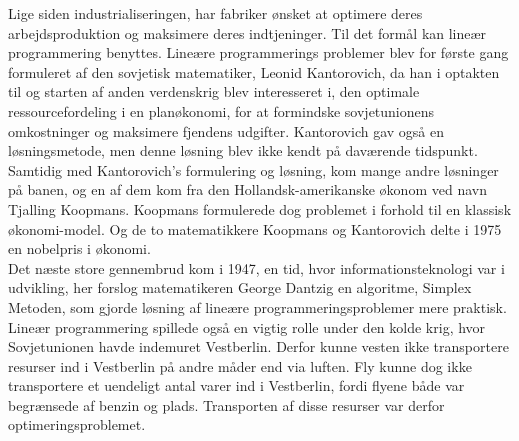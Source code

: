 Lige siden industrialiseringen, har fabriker ønsket at optimere deres arbejdsproduktion og maksimere deres indtjeninger. 
Til det formål kan lineær programmering benyttes.
Lineære programmerings problemer blev for første gang formuleret af den sovjetisk matematiker, Leonid Kantorovich, da han i optakten til og starten af anden verdenskrig blev  interesseret i, den optimale ressourcefordeling i en planøkonomi, for at formindske sovjetunionens omkostninger og maksimere fjendens udgifter. Kantorovich gav også en løsningsmetode, men denne løsning blev ikke kendt på daværende tidspunkt.\\
Samtidig med Kantorovich's formulering og løsning, kom  mange andre løsninger på banen, og en af dem kom fra den Hollandsk-amerikanske økonom ved navn Tjalling Koopmans. Koopmans formulerede dog problemet i forhold til en klassisk økonomi-model. 
Og de to matematikkere Koopmans og Kantorovich delte i 1975 en nobelpris i økonomi.\\
Det næste store gennembrud kom i 1947, en tid, hvor informationsteknologi var i udvikling, her forslog matematikeren George Dantzig  en algoritme, Simplex Metoden, som gjorde løsning af lineære programmeringsproblemer mere praktisk. 
\\%
Lineær programmering spillede også en vigtig rolle under den kolde krig, hvor Sovjetunionen havde indemuret Vestberlin.
Derfor kunne vesten ikke transportere resurser ind i Vestberlin på andre måder end via luften.
Fly kunne dog ikke transportere et uendeligt antal varer ind i Vestberlin, fordi flyene både var begrænsede af benzin og plads. 
Transporten af disse resurser var derfor optimeringsproblemet. \citep{bert} \citep{lay}